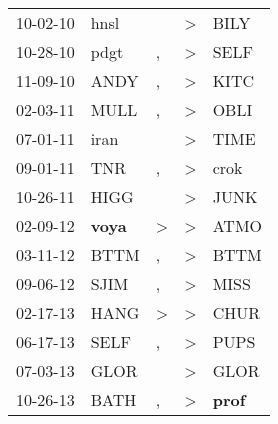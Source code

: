 \begin{supertabular}{p{0.07\textwidth}p{0.06\textwidth}p{0.02\textwidth}p{0.02\textwidth}p{0.06\textwidth}}
          10-02-10\textsuperscript{} &           hnsl\textsuperscript{} &                  &     \textgreater &           BILY\textsuperscript{} \\
          10-28-10\textsuperscript{} &           pdgt\textsuperscript{} &                , &     \textgreater &           SELF\textsuperscript{} \\
          11-09-10\textsuperscript{} &           ANDY\textsuperscript{} &                , &     \textgreater &           KITC\textsuperscript{} \\
          02-03-11\textsuperscript{} &           MULL\textsuperscript{} &                , &     \textgreater &           OBLI\textsuperscript{} \\
          07-01-11\textsuperscript{} &           iran\textsuperscript{} &                  &     \textgreater &           TIME\textsuperscript{} \\
          09-01-11\textsuperscript{} &            TNR\textsuperscript{} &                , &     \textgreater &           crok\textsuperscript{} \\
          10-26-11\textsuperscript{} &           HIGG\textsuperscript{} &                  &     \textgreater &           JUNK\textsuperscript{} \\
          02-09-12\textsuperscript{} &  \textbf{voya\textsuperscript{}} &     \textgreater &     \textgreater &           ATMO\textsuperscript{} \\
          03-11-12\textsuperscript{} &           BTTM\textsuperscript{} &                , &     \textgreater &           BTTM\textsuperscript{} \\
          09-06-12\textsuperscript{} &           SJIM\textsuperscript{} &                , &     \textgreater &           MISS\textsuperscript{} \\
          02-17-13\textsuperscript{} &           HANG\textsuperscript{} &     \textgreater &     \textgreater &           CHUR\textsuperscript{} \\
          06-17-13\textsuperscript{} &           SELF\textsuperscript{} &                , &     \textgreater &           PUPS\textsuperscript{} \\
          07-03-13\textsuperscript{} &           GLOR\textsuperscript{} &                  &     \textgreater &           GLOR\textsuperscript{} \\
          10-26-13\textsuperscript{} &           BATH\textsuperscript{} &                , &     \textgreater &  \textbf{prof\textsuperscript{}} \\

\end{supertabular}
